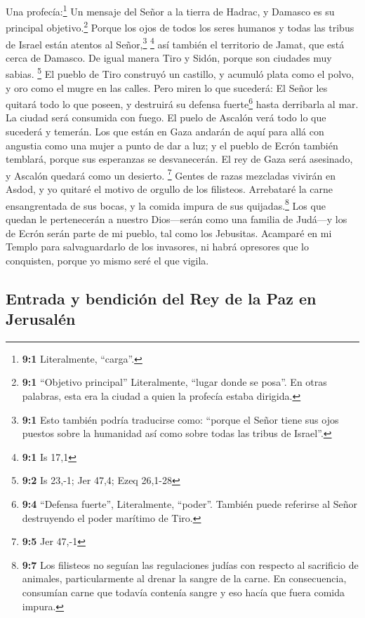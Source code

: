  Una profecía:\footnote{\textbf{9:1} Literalmente,
  ``carga''.} Un mensaje del Señor a la tierra de Hadrac, y Damasco es
su principal objetivo.\footnote{\textbf{9:1} ``Objetivo principal''
  Literalmente, ``lugar donde se posa''. En otras palabras, esta era la
  ciudad a quien la profecía estaba dirigida.} Porque los ojos de todos
los seres humanos y todas las tribus de Israel están atentos al
Señor,\footnote{\textbf{9:1} Esto también podría traducirse como:
  ``porque el Señor tiene sus ojos puestos sobre la humanidad así como
  sobre todas las tribus de Israel''.} \footnote{\textbf{9:1} Is 17,1}
 así también el territorio de Jamat, que está cerca de
Damasco. De igual manera Tiro y Sidón, porque son ciudades muy sabias.
\footnote{\textbf{9:2} Is 23,-1; Jer 47,4; Ezeq 26,1-28} 
El pueblo de Tiro construyó un castillo, y acumuló plata como el polvo,
y oro como el mugre en las calles.  Pero miren lo que
sucederá: El Señor les quitará todo lo que poseen, y destruirá su
defensa fuerte\footnote{\textbf{9:4} ``Defensa fuerte'', Literalmente,
  ``poder''. También puede referirse al Señor destruyendo el poder
  marítimo de Tiro.} hasta derribarla al mar. La ciudad será consumida
con fuego.  El puelo de Ascalón verá todo lo que sucederá
y temerán. Los que están en Gaza andarán de aquí para allá con angustia
como una mujer a punto de dar a luz; y el pueblo de Ecrón también
temblará, porque sus esperanzas se desvanecerán. El rey de Gaza será
asesinado, y Ascalón quedará como un desierto. \footnote{\textbf{9:5}
  Jer 47,-1}  Gentes de razas mezcladas vivirán en Asdod,
y yo quitaré el motivo de orgullo de los filisteos. 
Arrebataré la carne ensangrentada de sus bocas, y la comida impura de
sus quijadas.\footnote{\textbf{9:7} Los filisteos no seguían las
  regulaciones judías con respecto al sacrificio de animales,
  particularmente al drenar la sangre de la carne. En consecuencia,
  consumían carne que todavía contenía sangre y eso hacía que fuera
  comida impura.} Los que quedan le pertenecerán a nuestro Dios---serán
como una familia de Judá---y los de Ecrón serán parte de mi pueblo, tal
como los Jebusitas.  Acamparé en mi Templo para
salvaguardarlo de los invasores, ni habrá opresores que lo conquisten,
porque yo mismo seré el que vigila.

\hypertarget{entrada-y-bendiciuxf3n-del-rey-de-la-paz-en-jerusaluxe9n}{%
\subsection{Entrada y bendición del Rey de la Paz en
Jerusalén}\label{entrada-y-bendiciuxf3n-del-rey-de-la-paz-en-jerusaluxe9n}}

